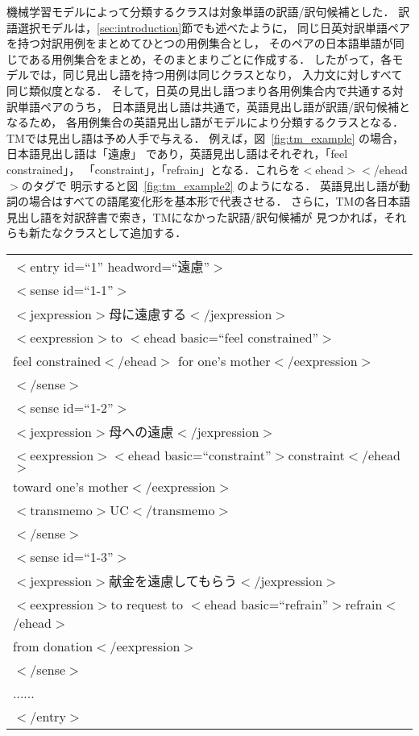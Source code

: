 機械学習モデルによって分類するクラスは対象単語の訳語/訳句候補とした．
訳語選択モデルは，\ref{sec:introduction}節でも述べたように，
同じ日英対訳単語ペアを持つ対訳用例をまとめてひとつの用例集合とし，
そのペアの日本語単語が同じである用例集合をまとめ，そのまとまりごとに作成する．
したがって，各モデルでは，同じ見出し語を持つ用例は同じクラスとなり，
入力文に対しすべて同じ類似度となる．
そして，日英の見出し語つまり各用例集合内で共通する対訳単語ペアのうち，
日本語見出し語は共通で，英語見出し語が訳語/訳句候補となるため，
各用例集合の英語見出し語がモデルにより分類するクラスとなる．
TMでは見出し語は予め人手で与える．
例えば，図~\ref{fig:tm_example} の場合，日本語見出し語は「遠慮」
であり，英語見出し語はそれぞれ，「feel constrained」，
「constraint」，「refrain」となる．これらを$<$ehead$>$$<$/ehead$>$のタグで
明示すると図~\ref{fig:tm_example2} のようになる．
英語見出し語が動詞の場合はすべての語尾変化形を基本形で代表させる．
さらに，TMの各日本語見出し語を対訳辞書で索き，TMになかった訳語/訳句候補が
見つかれば，それらも新たなクラスとして追加する．
\begin{figure*}[htbp]
  \begin{center}
    \begin{tabular}[c]{l}
      $<$entry id=``1'' headword=``遠慮''$>$\\
      \q  $<$sense id=``1-1''$>$\\
      \q\q    $<$jexpression$>$母に遠慮する$<$/jexpression$>$\\
      \q\q    $<$eexpression$>$to $<$ehead basic=``feel constrained''$>$\\
      \q\q    feel constrained$<$/ehead$>$ for one's mother$<$/eexpression$>$\\
      \q  $<$/sense$>$\\
      \q  $<$sense id=``1-2''$>$\\
      \q\q    $<$jexpression$>$母への遠慮$<$/jexpression$>$\\
      \q\q    $<$eexpression$>$$<$ehead basic=``constraint''$>$constraint$<$/ehead$>$ \\
      \q\q    toward one's mother$<$/eexpression$>$\\
      \q\q    $<$transmemo$>$UC$<$/transmemo$>$\\
      \q  $<$/sense$>$\\
      \q  $<$sense id=``1-3''$>$\\
      \q\q    $<$jexpression$>$献金を遠慮してもらう$<$/jexpression$>$\\
      \q\q    $<$eexpression$>$to request to 
      $<$ehead basic=``refrain''$>$refrain$<$/ehead$>$ \\
      \q\q    from donation$<$/eexpression$>$\\
      \q  $<$/sense$>$\\
      \q  ......\\
      $<$/entry$>$\\
    \end{tabular}
    \caption{TMの例}
    \label{fig:tm_example2}
  \end{center}
\end{figure*}

